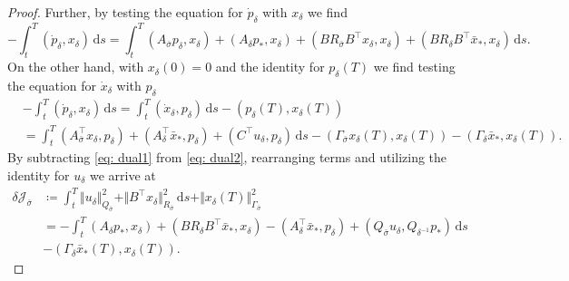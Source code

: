 \documentclass[10pt,a4paper]{amsart}
\begin{document}
\begin{proof}
    Further, by testing the equation for $\dot{p}_{\delta}$ with $x_{\delta}$ we find 
    \begin{equation}\label{eq: dual1}
        -\int_t^T (\dot{p}_{\delta}, x_{\delta}) \, \mathrm{d}s
        =
        \int_t^T
        (A_{\bar{\sigma}} p_{\delta}, x_{\delta} )
        + 
        (A_{\delta} p_*, x_{\delta} )
        +
        (B R_{\bar{\sigma}} B^\top x_{\delta}, x_{\delta} )
        +
        (B R_{\delta} B^\top \bar{x}_*, x_{\delta})
        \, \mathrm{d}s.
    \end{equation}
    On the other hand, with $x_{\delta} (0) = 0$ and the identity for $p_{\delta} (T)$ we find testing the equation for $\dot x_\delta$ with $p_\delta$
    \begin{equation}\label{eq: dual2}
    \begin{aligned}
        &-\int_t^T (\dot{p}_{\delta}, x_{\delta}) \, \mathrm{d}s
        = \int_t^T (\dot{x}_{\delta}, p_{\delta}) \, \mathrm{d}s
            - (p_{\delta}(T),x_{\delta}(T))\\
        &= \int_t^T 
        (A_{\bar{\sigma}}^\top x_{\delta}, p_{\delta})
        + (A_{\delta}^\top \bar{x}_*, p_{\delta} )
        + ( C^\top u_{\delta}, p_{\delta} )
        \, \mathrm{d}s
        - ( \Gamma_{\bar{\sigma}} x_{\delta}(T), x_{\delta}(T) )
        - ( \Gamma_{\delta} \bar{x}_*, x_{\delta}(T) ).
    \end{aligned}
    \end{equation}
    By subtracting \eqref{eq: dual1} from \eqref{eq: dual2}, rearranging terms and utilizing the identity for $u_{\delta}$ we arrive at
    \begin{equation*}
    \begin{aligned}
        \delta \mathcal{J}_{\bar{\sigma}}
        &\coloneqq
        \int_t^T 
        \Vert u_{\delta} \Vert_{Q_{\bar{\sigma}}}^2
        + \Vert B^\top x_{\delta} \Vert_{R_{\bar{\sigma}}}^2
        \, \mathrm{d}s
        + \Vert x_{\delta}(T) \Vert_{\Gamma_{\bar{\sigma}}}^2\\
        &=
        - \int_t^T  
        (A_{\delta} p_* , x_{\delta})
        + (B R_{\delta} B^\top \bar{x}_*, x_{\delta})
        - ( A_{\delta}^\top \bar{x}_*, p_{\delta} )
        + ( Q_{\bar{\sigma}} u_{\delta}, Q_{\delta^{-1}} p_* )
        \, \mathrm{d}s\\
        &- ( \Gamma_{\delta} \bar{x}_*(T), x_{\delta}(T) ).
    \end{aligned}
    \end{equation*}

\end{proof}
\end{document}
